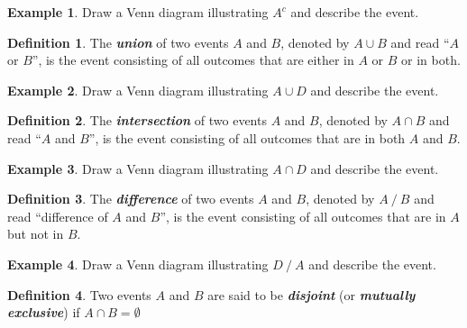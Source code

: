 \documentclass[
  11pt,
]{book}
\theoremstyle{definition}
\newtheorem{definition}{Definition}[chapter]
\theoremstyle{definition}
\newtheorem{example}{Example}[chapter]
\theoremstyle{definition}
\theoremstyle{definition}
\theoremstyle{remark}
\begin{document}
\begin{example}
Draw a Venn diagram illustrating \(A^c\) and describe the event.
\end{example}

\hfill\break
\hfill\break
\hfill\break
\hfill\break
\hfill\break

\begin{definition}
The \textbf{\emph{union}} of two events \(A\) and \(B\), denoted by \(A \cup B\) and read ``\(A\) or \(B\)'', is the event consisting of all outcomes that are either in \(A\) or \(B\) or in both.
\end{definition}

\begin{example}
Draw a Venn diagram illustrating \(A \cup D\) and describe the event.
\end{example}

\hfill\break
\hfill\break
\hfill\break
\hfill\break
\hfill\break

\begin{definition}
The \textbf{\emph{intersection}} of two events \(A\) and \(B\), denoted by \(A \cap B\) and read ``\(A\) and \(B\)'', is the event consisting of all outcomes that are in both \(A\) and \(B\).
\end{definition}

\begin{example}
Draw a Venn diagram illustrating \(A \cap D\) and describe the event.
\end{example}

\hfill\break
\hfill\break
\hfill\break
\hfill\break
\hfill\break

\begin{definition}
The \textbf{\emph{difference}} of two events \(A\) and \(B\), denoted by \(A \mathbin{/} B\) and read ``difference of \(A\) and \(B\)'', is
the event consisting of all outcomes that are in \(A\) but not in \(B\).
\end{definition}

\begin{example}
Draw a Venn diagram illustrating \(D \mathbin{/} A\) and describe the event.
\end{example}

\hfill\break
\hfill\break
\hfill\break
\hfill\break
\hfill\break

\begin{definition}
Two events \(A\) and \(B\) are said to be \textbf{\emph{disjoint}} (or \textbf{\emph{mutually exclusive}}) if \(A \cap B = \emptyset\)
\end{definition}
\end{document}
